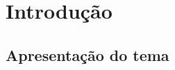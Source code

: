 \documentclass[twoside, 12pt, english,italian,latin,greek,french,spanish,brazil]{book}
\begin{document}
\newpage

\section{Introdução}
    \maketitle

    

    \subsection{Apresentação do tema}	
\end{document}
